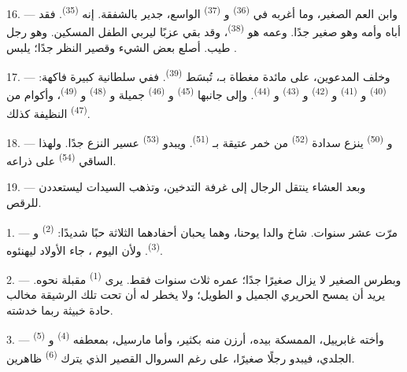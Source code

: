 16. --- وابن العم الصغير، وما أغربه في  \textsuperscript{(36)}
و \textsuperscript{(37)} الواسع، جدير بالشفقة. إنه 
\textsuperscript{(35)}. فقد أباه وأمه وهو صغير جدًا. وعمه هو 
\textsuperscript{(38)}، وقد بقي عزبًا ليربي الطفل المسكين. وهو رجل طيب. أصلع
بعض الشيء وقصير النظر جدًا؛ يلبس .

\VUsaut{2.4mm}
\VUsaut{3.0mm}

17. --- وخلف المدعوين، على مائدة مغطاة بـ، تُبسَط
 \textsuperscript{(39)}. ففي سلطانية كبيرة فاكهة:
 \textsuperscript{(40)} و \textsuperscript{(41)}
و \textsuperscript{(42)} و \textsuperscript{(43)}
و \textsuperscript{(44)}. وإلى جانبها 
\textsuperscript{(45)} و \textsuperscript{(46)} جميلة
و \textsuperscript{(48)} و \textsuperscript{(49)}،
وأكوام من  \textsuperscript{(47)} النظيفة كذلك.

18. --- و \textsuperscript{(50)} ينزع سدادة 
\textsuperscript{(52)} من خمر عتيقة بـ \textsuperscript{(51)}.
ويبدو  \textsuperscript{(53)} عسير النزع جدًا. ولهذا الساقي
 \textsuperscript{(54)} على ذراعه.

19. --- وبعد العشاء ينتقل الرجال إلى غرفة التدخين، وتذهب السيدات
ليستعددن للرقص.

\VUsaut{5.0mm}
\VUsaut{1.6mm}
\VUsaut{2.6mm}

\VUsaut{3.0mm}

1. --- مرّت عشر سنوات. شاخ والدا يوحنا، وهما يحبان أحفادهما الثلاثة حبًا
شديدًا:  \textsuperscript{(2)} و \textsuperscript{(3)}.
ولأن اليوم ، جاء الأولاد ليهنئوه.

2. --- وبطرس الصغير لا يزال صغيرًا جدًا؛ عمره ثلاث سنوات فقط. يرى
 \textsuperscript{(1)} مقبلة نحوه. يريد أن يمسح 
الحريري الجميل و الطويل؛ ولا يخطر له أن تحت تلك
 الرشيقة مخالب حادة خبيثة ربما خدشته.

3. --- وأخته غابرييل، الممسكة بيده، أرزن منه بكثير، وأما مارسيل، بمعطفه
 \textsuperscript{(4)} و \textsuperscript{(5)} الجلدي،
فيبدو رجلًا صغيرًا، على رغم السروال القصير الذي يترك 
\textsuperscript{(6)} ظاهرين.


